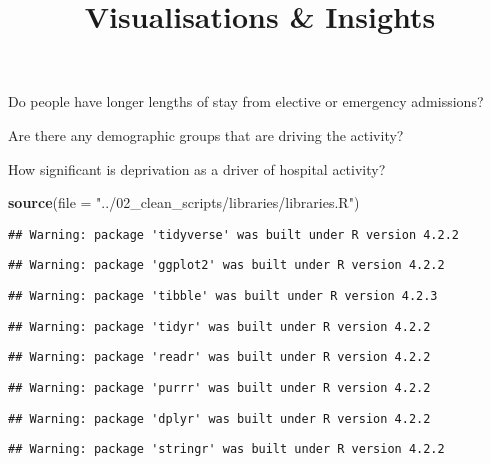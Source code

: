 \documentclass[
]{article}
\title{Visualisations \& Insights}
\author{}
\date{\vspace{-2.5em}}
\newenvironment{Shaded}{\begin{snugshade}}{\end{snugshade}}
\newcommand{\AttributeTok}[1]{\textcolor[rgb]{0.13,0.29,0.53}{#1}}
\newcommand{\FunctionTok}[1]{\textcolor[rgb]{0.13,0.29,0.53}{\textbf{#1}}}
\newcommand{\NormalTok}[1]{#1}
\newcommand{\StringTok}[1]{\textcolor[rgb]{0.31,0.60,0.02}{#1}}
\begin{document}
\maketitle

Do people have longer lengths of stay from elective or emergency
admissions?

Are there any demographic groups that are driving the activity?

How significant is deprivation as a driver of hospital activity?

\begin{Shaded}
\begin{Highlighting}[]
\FunctionTok{source}\NormalTok{(}\AttributeTok{file =} \StringTok{"../02\_clean\_scripts/libraries/libraries.R"}\NormalTok{)}
\end{Highlighting}
\end{Shaded}

\begin{verbatim}
## Warning: package 'tidyverse' was built under R version 4.2.2
\end{verbatim}

\begin{verbatim}
## Warning: package 'ggplot2' was built under R version 4.2.2
\end{verbatim}

\begin{verbatim}
## Warning: package 'tibble' was built under R version 4.2.3
\end{verbatim}

\begin{verbatim}
## Warning: package 'tidyr' was built under R version 4.2.2
\end{verbatim}

\begin{verbatim}
## Warning: package 'readr' was built under R version 4.2.2
\end{verbatim}

\begin{verbatim}
## Warning: package 'purrr' was built under R version 4.2.2
\end{verbatim}

\begin{verbatim}
## Warning: package 'dplyr' was built under R version 4.2.2
\end{verbatim}

\begin{verbatim}
## Warning: package 'stringr' was built under R version 4.2.2
\end{verbatim}
\end{document}
